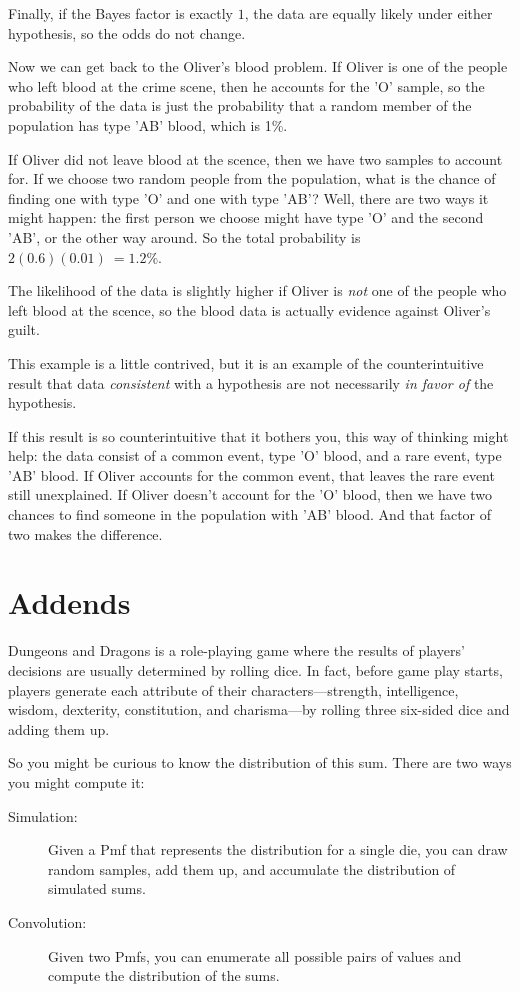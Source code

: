 \documentclass[12pt]{book}
\begin{document}
Finally, if the Bayes factor is exactly $1$, the data are equally
likely under either hypothesis, so the odds do not change.

Now we can get back to the Oliver's blood problem.  If Oliver is
one of the people who left blood at the crime scene, then he
accounts for the 'O' sample, so the probability of the data
is just the probability that a random member of the population
has type 'AB' blood, which is 1\%.

If Oliver did not leave blood at the scence, then we have two
samples to account for.  If we choose two random people from
the population, what is the chance of finding one with type 'O'
and one with type 'AB'?  Well, there are two ways it might happen:
the first person we choose might have type 'O' and the second
'AB', or the other way around.  So the total probability is
$2 (0.6) (0.01)\ = 1.2\%$.

The likelihood of the data is slightly higher if Oliver is
{\it not} one of the people who left blood at the scence, so
the blood data is actually evidence against Oliver's guilt.

This example is a little contrived, but it is an example of
the counterintuitive result that data {\it consistent} with
a hypothesis are not necessarily {\it in favor of}
the hypothesis.

If this result is so counterintuitive that it bothers you,
this way of thinking might help: the data consist of a common
event, type 'O' blood, and a rare event, type 'AB' blood.
If Oliver accounts for the common event, that leaves the rare
event still unexplained.  If Oliver doesn't account for the
'O' blood, then we have two chances to find someone in the
population with 'AB' blood.  And that factor of two makes
the difference.

\section{Addends}

Dungeons and Dragons is a role-playing game where the results
of players' decisions are usually determined by rolling dice.
In fact, before game play starts, players generate each
attribute of their characters---strength, intelligence, wisdom,
dexterity, constitution, and charisma---by rolling three
six-sided dice and adding them up.

So you might be curious to know the distribution of this sum.
There are two ways you might compute it:

\begin{description}

\item[Simulation:] Given a Pmf that represents the distribution
for a single die, you can draw random samples, add them up,
and accumulate the distribution of simulated sums.

\item[Convolution:] Given two Pmfs, you can enumerate all possible
pairs of values and compute the distribution of the sums.

\end{description}
\end{document}
